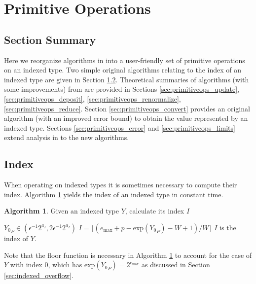 \documentclass[12pt]{article}
\providecommand{\exp}{\ensuremath{\text{exp}}}
\providecommand{\max}{\ensuremath{\text{max}}}
\theoremstyle{definition}
\newtheorem{alg}{Algorithm}[section]
\numberwithin{equation}{section}
\numberwithin{figure}{section}
\begin{document}
\section{Primitive Operations}
  \subsection{Section Summary}
    Here we reorganize algorithms in \cite{repsum} into a user-friendly set of primitive operations on an indexed type. Two simple original algorithms relating to the index of an indexed type are given in Section \ref{sec:primitiveops_index}. Theoretical summaries of algorithms (with some improvements) from \cite{repsum} are provided in Sections \ref{sec:primitiveops_update}, \ref{sec:primitiveops_deposit}, \ref{sec:primitiveops_renormalize}, \ref{sec:primitiveops_reduce}. Section \ref{sec:primitiveops_convert} provides an original algorithm (with an improved error bound) to obtain the value represented by an indexed type. Sections \ref{sec:primitiveops_error} and \ref{sec:primitiveops_limits} extend analysis in \cite{repsum} to the new algorithms.
  \subsection{Index}
    \label{sec:primitiveops_index}
    When operating on indexed types it is sometimes necessary to compute their index. Algorithm \ref{alg:iindex} yields the index of an indexed type in constant time.

    \begin{samepage}
    \begin{alg}
      Given an indexed type $Y$, calculate its index $I$
      \begin{algorithmic}[1]
        \Require
          \Statex ${Y_0}_P \in (\epsilon^{-1}  2^{a_{I}}, 2  \epsilon^{-1}  2^{a_I})$
          \State $I = \lfloor(e_{\max} + p - \exp({Y_0}_P) - W + 1)/W\rfloor$
        \EndFunction
        \Ensure
          \Statex $I$ is the index of $Y$.
      \end{algorithmic}
      \label{alg:iindex}
    \end{alg}
    \end{samepage}

    Note that the floor function is necessary in Algorithm \ref{alg:iindex} to account for the case of $Y$ with index $0$, which has $\exp({Y_0}_P) = 2^{e_{\max}}$ as discussed in Section \ref{sec:indexed_overflow}.
\end{document}
